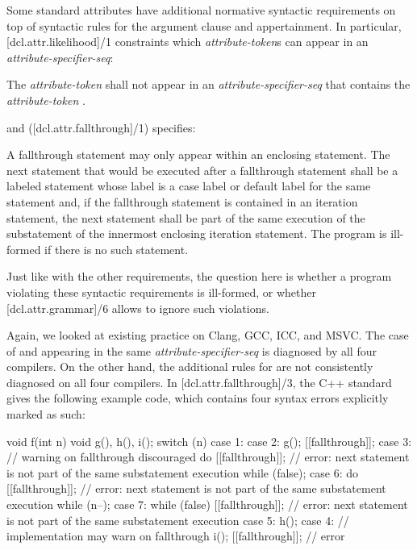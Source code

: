 \label{subsec:additionalreqs}
Some standard attributes have additional normative syntactic requirements on top of syntactic rules for the argument clause and appertainment. In particular, [dcl.attr.likelihood]/1 constraints which \emph{attribute-token}s can appear in an \emph{attribute-specifier-seq}:


\begin{adjustwidth}{0.5cm}{0.5cm}
The \emph{attribute-token}  shall not appear in an \emph{attribute-specifier-seq} that contains the \emph{attribute-token} .
\end{adjustwidth}

and ([dcl.attr.fallthrough]/1) specifies:

\begin{adjustwidth}{0.5cm}{0.5cm}
A fallthrough statement may only appear within an enclosing  statement. The next statement that would be executed after a fallthrough statement shall be a labeled statement whose label is a case label or default label for the same  statement and, if the fallthrough statement is contained in an iteration statement, the next statement shall be part of the same execution of the substatement of the innermost enclosing iteration statement. The program is ill-formed if there is no such statement.
\end{adjustwidth}

Just like with the other requirements, the question here is whether a program violating these syntactic requirements is ill-formed, or whether [dcl.attr.grammar]/6 allows to ignore such violations.

Again, we looked at existing practice on Clang, GCC, ICC, and MSVC. The case of  and  appearing in the same \emph{attribute-specifier-seq} is diagnosed by all four compilers. On the other hand, the additional rules for  are not consistently diagnosed on all four compilers. In [dcl.attr.fallthrough]/3, the C++ standard gives the following example code, which contains four syntax errors explicitly marked as such:
\begin{codeblock}
void f(int n) {
  void g(), h(), i();
  switch (n) {
  case 1:
  case 2:
    g();
    [[fallthrough]];
  case 3:                 // warning on fallthrough discouraged
    do {
      [[fallthrough]];    // error: next statement is not part of the same substatement execution
    } while (false);
  case 6:
    do {
      [[fallthrough]];    // error: next statement is not part of the same substatement execution
    } while (n--);
  case 7:
    while (false) {
      [[fallthrough]];    // error: next statement is not part of the same substatement execution
    }
  case 5:
    h();
  case 4:                 // implementation may warn on fallthrough
    i();
    [[fallthrough]];      // error
  }
}
\end{codeblock}

